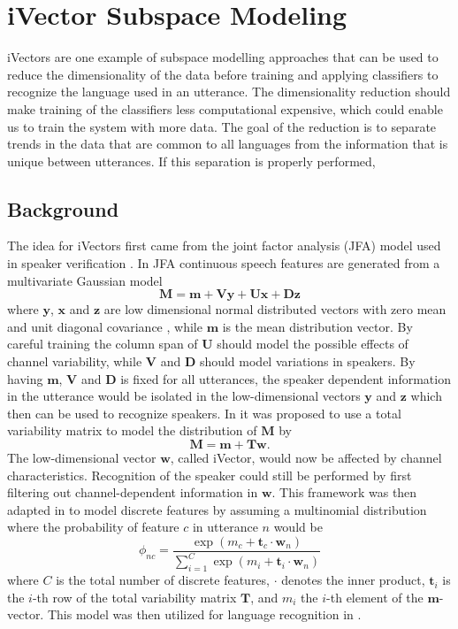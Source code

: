 \chapter{iVector Subspace Modeling}
\label{sect:ivecttheory}

iVectors are one example of subspace modelling approaches that can be used to reduce the dimensionality of the data before training and applying classifiers to recognize the language used in an utterance. The dimensionality reduction should make training of the classifiers less computational expensive, which could enable us to train the system with more data. The goal of the reduction is to separate trends in the data that are common to all languages from the information that is unique between utterances. If this separation is properly performed, 

\section{Background}

The idea for iVectors first came from the joint factor analysis (JFA) model used in speaker verification \cite{dehak2011front}. In JFA continuous speech features are generated from a multivariate Gaussian model
\begin{equation}
\label{jfa}
\mathbf{M}=\mathbf{m}+\mathbf{Vy}+\mathbf{Ux}+\mathbf{Dz}
\end{equation}
where $\mathbf{y}$, $\mathbf{x}$ and $\mathbf{z}$ are low dimensional normal distributed vectors with zero mean and unit diagonal covariance \cite{dehak2011front}, while $\mathbf{m}$ is the mean distribution vector. By careful training the column span of $\mathbf{U}$ should model the possible effects of channel variability, while $\mathbf{V}$ and $\mathbf{D}$ should model variations in speakers. By having $\mathbf{m}$, $\mathbf{V}$ and $\mathbf{D}$ is fixed for all utterances, the speaker dependent information in the utterance would be isolated in the low-dimensional vectors $\mathbf{y}$ and $\mathbf{z}$ which then can be used to recognize speakers. In \cite{dehak2011front} it was proposed to use a total variability matrix to model the distribution of $\mathbf{M}$ by
\begin{equation}
\label{ffa}
\mathbf{M}=\mathbf{m}+\mathbf{Tw}.
\end{equation}
The low-dimensional vector $\mathbf{w}$, called iVector, would now be affected by channel characteristics. Recognition of the speaker could still be performed by first filtering out channel-dependent information in $\mathbf{w}$. This framework was then adapted in \cite{svivector} to model discrete features by assuming a multinomial distribution where the probability of feature $c$ in utterance $n$ would be 
\begin{equation}
\label{phieq}
\phi_{nc}=\frac{\exp(m_c+\mathbf{t}_c \cdot \mathbf{w}_n)}{\sum_{i=1}^C \exp(m_i+\mathbf{t}_i \cdot \mathbf{w}_n)}
\end{equation}
where $C$ is the total number of discrete features, $\cdot$ denotes the inner product, $\mathbf{t}_i$ is the $i$-th row of the total variability matrix $\mathbf{T}$, and $m_i$ the $i$-th element of the $\mathbf{m}$-vector. This model was then utilized for language recognition in \cite{lrivector}.

